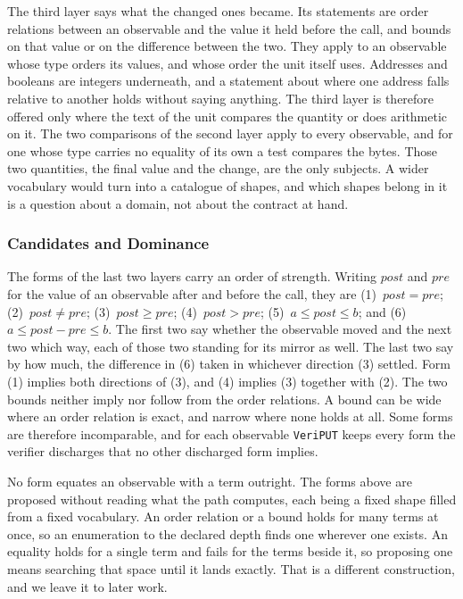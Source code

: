 \documentclass[manuscript,anonymous]{acmart}
\newcommand{\tool}[1]{\texttt{#1}}
\begin{document}
The third layer says what the changed ones became. Its statements are order
relations between an observable and the value it held before the call, and
bounds on that value or on the difference between the two. They apply to an
observable whose type orders its values, and whose order the unit itself uses.
Addresses and booleans are integers underneath, and a statement about where one
address falls relative to another holds without saying anything. The third layer
is therefore offered only where the text of the unit compares the quantity or
does arithmetic on it. The two comparisons of the second layer apply to every
observable, and for one whose type carries no equality of its own a test
compares the bytes. Those two quantities,
the final value and the change, are the only subjects. A wider vocabulary would
turn into a catalogue of shapes, and which shapes belong in it is a question
about a domain, not about the contract at hand.

\subsubsection{Candidates and Dominance}
The forms of the last two layers carry an order of strength. Writing
$\mathit{post}$ and $\mathit{pre}$ for the value of an observable after and
before the call, they are
(1)~$\mathit{post} = \mathit{pre}$;
(2)~$\mathit{post} \neq \mathit{pre}$;
(3)~$\mathit{post} \geq \mathit{pre}$;
(4)~$\mathit{post} > \mathit{pre}$;
(5)~$a \leq \mathit{post} \leq b$;
and (6)~$a \leq \mathit{post} - \mathit{pre} \leq b$.
The first two say whether the observable moved and the next two which way, each
of those two standing for its mirror as well. The last two say by how much, the
difference in (6) taken in whichever direction (3) settled. Form (1) implies
both directions of (3), and (4) implies (3) together with (2). The two bounds
neither imply nor follow from the order relations. A bound can be wide where an
order relation is exact, and narrow where none holds at all. Some forms are
therefore incomparable, and for each observable \tool{VeriPUT} keeps every form
the verifier discharges that no other discharged form implies.

No form equates an observable with a term outright. The forms above are proposed
without reading what the path computes, each being a fixed shape filled from a
fixed vocabulary. An order relation or a bound holds for many terms at once, so
an enumeration to the declared depth finds one wherever one exists. An equality
holds for a single term and fails for the terms beside it, so proposing one
means searching that space until it lands exactly. That is a different
construction, and we leave it to later work.
\end{document}
